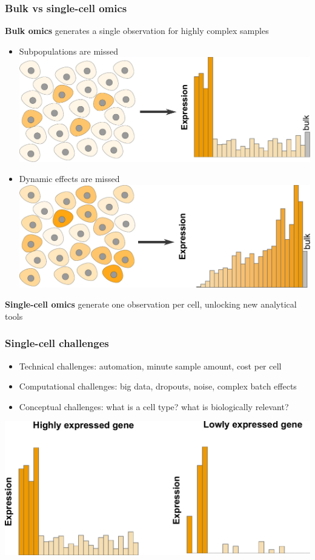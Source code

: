 \documentclass{beamer}
\begin{document}
\begin{frame}[c]
  \frametitle{Bulk vs single-cell omics}
  
  \small
  
  \textbf{Bulk omics} generates a single observation for highly 
  complex samples 
  
  \pause
  
  \begin{itemize}
    \item Subpopulations are missed \\
      \includegraphics[width=0.6\linewidth]{figs/bulk_issue1.pdf}
    \item Dynamic effects are missed \\
      \includegraphics[width=0.6\linewidth]{figs/bulk_issue2.pdf}
  \end{itemize}
  
  \pause
  
  \textbf{Single-cell omics} generate one observation per cell, 
  unlocking new analytical tools
\end{frame}

\begin{frame}[c]
  \frametitle{Single-cell challenges}
  
  \begin{itemize}
    \item Technical challenges: automation, minute sample amount, cost 
      per cell
    \item Computational challenges: big data, dropouts, noise, complex
      batch effects
    \item Conceptual challenges: what is a cell type? what is 
      biologically relevant? 
  \end{itemize}
  
  \vspace{0.5cm}
  \centering
  \includegraphics[width=0.8\linewidth]{figs/sc_issue.pdf}
\end{frame}
\end{document}
